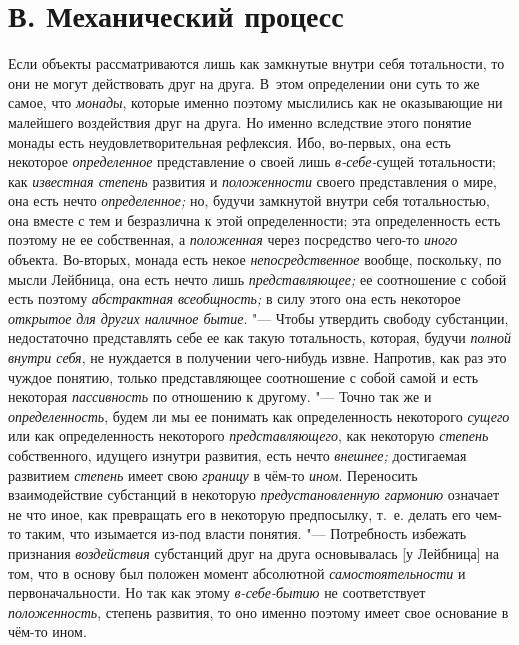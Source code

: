 \section[В. Механический процесс]{В. Механический процесс}
Если объекты рассматриваются лишь как замкнутые внутри себя
тотальности, то они не могут действовать друг на друга. В~этом определении
они суть то же самое, что {\em монады},
которые именно поэтому мыслились как не оказывающие ни
малейшего воздействия друг на друга. Но именно вследствие этого понятие
монады есть неудовлетворительная рефлексия. Ибо, во-первых, она есть
некоторое {\em определенное} представление о своей лишь {\em в-себе-}сущей
тотальности; как {\em известная степень} развития и {\em положенности} своего
представления о мире, она есть нечто {\em определенное;} но,
будучи замкнутой внутри себя тотальностью, она вместе с тем и безразлична к
этой определенности; эта определенность есть поэтому не ее собственная, а
{\em положенная} через посредство чего-то {\em иного}
объекта. Во-вторых, монада есть некое {\em непосредственное}
вообще, поскольку, по мысли Лейбница, она есть нечто лишь
{\em представляющее;} ее соотношение с собой есть поэтому
{\em абстрактная всеобщность;} в силу этого она есть некоторое
{\em открытое} {\em для других наличное бытие}. "---
Чтобы утвердить свободу субстанции, недостаточно представлять
себе ее как такую тотальность, которая, будучи {\em полной внутри себя},
не нуждается в получении чего-нибудь извне. Напротив, как раз
это чуждое понятию, только представляющее соотношение с собой самой и есть
некоторая {\em пассивность} по отношению к другому. "--- Точно так же и
{\em определенность}, будем ли мы ее понимать как определенность некоторого
{\em сущего} или как определенность некоторого {\em представляющего},
как некоторую {\em степень} собственного, идущего изнутри развития, есть нечто
{\em внешнее;} достигаемая развитием {\em степень} имеет свою
{\em границу} в чём-то {\em ином}. Переносить
взаимодействие субстанций в некоторую
{\em предустановленную гармонию}
означает не что иное, как превращать его в некоторую
предпосылку, т.~е. делать его чем-то таким, что изымается из-под власти
понятия. "--- Потребность избежать признания {\em воздействия}
субстанций друг на друга основывалась [у Лейбница] на том,
что в основу был положен момент абсолютной
{\em самостоятельности} и первоначальности. Но так как этому
{\em в-себе-бытию} не соответствует {\em положенность},
степень развития, то оно именно поэтому имеет свое основание в чём-то ином.

